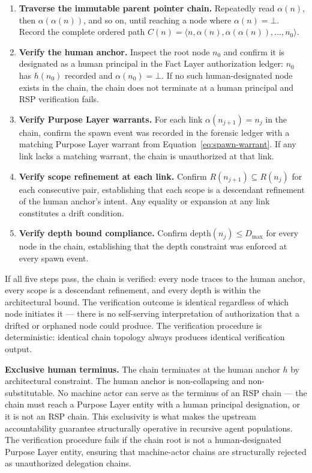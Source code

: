 \begin{enumerate}
    \item[(V1)] \textbf{Traverse the immutable parent pointer chain.} Repeatedly read $\alpha(n)$, then $\alpha(\alpha(n))$, and so on, until reaching a node where $\alpha(n) = \bot$. Record the complete ordered path $C(n) = \langle n, \alpha(n), \alpha(\alpha(n)), \ldots, n_0 \rangle$.

    \item[(V2)] \textbf{Verify the human anchor.} Inspect the root node $n_0$ and confirm it is designated as a human principal in the Fact Layer authorization ledger: $n_0$ has $h(n_0)$ recorded and $\alpha(n_0) = \bot$. If no such human-designated node exists in the chain, the chain does not terminate at a human principal and RSP verification fails.

    \item[(V3)] \textbf{Verify Purpose Layer warrants.} For each link $\alpha(n_{j+1}) = n_j$ in the chain, confirm the spawn event was recorded in the forensic ledger with a matching Purpose Layer warrant from Equation~\ref{eq:spawn-warrant}. If any link lacks a matching warrant, the chain is unauthorized at that link.

    \item[(V4)] \textbf{Verify scope refinement at each link.} Confirm $R(n_{j+1}) \subseteq R(n_j)$ for each consecutive pair, establishing that each scope is a descendant refinement of the human anchor's intent. Any equality or expansion at any link constitutes a drift condition.

    \item[(V5)] \textbf{Verify depth bound compliance.} Confirm $\text{depth}(n_j) \leq D_{\max}$ for every node in the chain, establishing that the depth constraint was enforced at every spawn event.
\end{enumerate}

If all five steps pass, the chain is verified: every node traces to the human anchor, every scope is a descendant refinement, and every depth is within the architectural bound. The verification outcome is identical regardless of which node initiates it — there is no self-serving interpretation of authorization that a drifted or orphaned node could produce. The verification procedure is deterministic: identical chain topology always produces identical verification output.

\medskip
\noindent\textbf{Exclusive human terminus.} The chain terminates at the human anchor $h$ by architectural constraint. The human anchor is non-collapsing and non-substitutable. No machine actor can serve as the terminus of an RSP chain — the chain must reach a Purpose Layer entity with a human principal designation, or it is not an RSP chain. This exclusivity is what makes the \bxthree{} upstream accountability guarantee structurally operative in recursive agent populations. The verification procedure fails if the chain root is not a human-designated Purpose Layer entity, ensuring that machine-actor chains are structurally rejected as unauthorized delegation chains.

